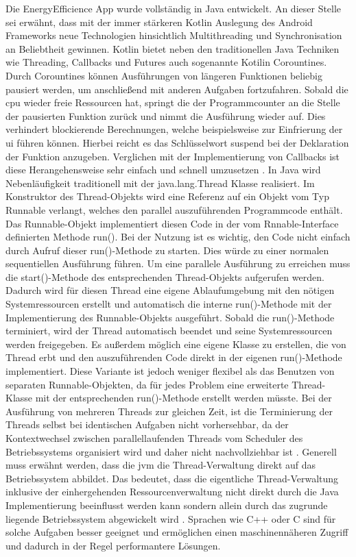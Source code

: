 Die \glqq EnergyEfficience\grqq{} App wurde vollständig in Java entwickelt. An dieser Stelle sei erwähnt, dass mit der immer stärkeren Kotlin Auslegung des Android Frameworks neue Technologien hinsichtlich Multithreading und Synchronisation an Beliebtheit gewinnen. Kotlin bietet neben den traditionellen Java Techniken wie Threading, Callbacks und Futures auch sogenannte Kotilin Corountines. Durch Corountines können Ausführungen von längeren Funktionen beliebig pausiert werden, um anschließend mit anderen Aufgaben fortzufahren. Sobald die \ac{cpu} wieder freie Ressourcen hat, springt die der Programmcounter an die Stelle der pausierten Funktion zurück und nimmt die Ausführung wieder auf. Dies verhindert blockierende Berechnungen, welche beispielsweise zur Einfrierung der \ac{ui} führen können. Hierbei reicht es das Schlüsselwort \glqq suspend\grqq{} bei der Deklaration der Funktion anzugeben. Verglichen mit der Implementierung von Callbacks ist diese Herangehensweise sehr einfach und schnell umzusetzen \cite{kotlin-corountines}. In Java wird Nebenläufigkeit traditionell mit der java.lang.Thread Klasse realisiert. Im  Konstruktor des Thread-Objekts wird eine Referenz auf ein Objekt vom Typ Runnable verlangt, welches den parallel auszuführenden Programmcode enthält. Das Runnable-Objekt implementiert diesen Code in der vom Rnnable-Interface definierten Methode run(). Bei der Nutzung ist es wichtig, den Code nicht einfach durch Aufruf dieser run()-Methode zu starten. Dies würde zu einer normalen sequentiellen Ausführung führen. Um eine parallele Ausführung zu erreichen muss die start()-Methode des entsprechenden Thread-Objekts aufgerufen werden. Dadurch wird für diesen Thread eine eigene Ablaufumgebung mit den nötigen Systemressourcen erstellt und automatisch die interne run()-Methode mit der Implementierung des Runnable-Objekts ausgeführt. Sobald die run()-Methode terminiert, wird der Thread automatisch beendet und seine Systemressourcen werden freigegeben. Es außerdem möglich eine eigene Klasse zu erstellen, die von Thread erbt und den auszuführenden Code direkt in der eigenen run()-Methode implementiert. Diese Variante ist jedoch weniger flexibel als das Benutzen von separaten Runnable-Objekten, da für jedes Problem eine erweiterte Thread-Klasse mit der entsprechenden run()-Methode erstellt werden müsste.  Bei der Ausführung von mehreren Threads zur gleichen Zeit, ist die Terminierung der Threads selbst bei identischen Aufgaben nicht vorhersehbar, da der Kontextwechsel zwischen parallellaufenden Threads vom Scheduler des Betriebssystems organisiert wird und daher nicht nachvollziehbar ist \cite{javaistauchnurInsel}. Generell muss erwähnt werden, dass die \ac{jvm} die Thread-Verwaltung direkt auf das Betriebssystem abbildet. Das bedeutet, dass die eigentliche Thread-Verwaltung inklusive der einhergehenden Ressourcenverwaltung nicht direkt durch die Java Implementierung beeinflusst werden kann sondern allein durch das zugrunde liegende Betriebssystem abgewickelt wird \cite{javaistauchnurInsel} . Sprachen wie C++ oder C sind für solche Aufgaben besser geeignet und ermöglichen einen maschinennäheren Zugriff und dadurch in der Regel performantere Lösungen.

